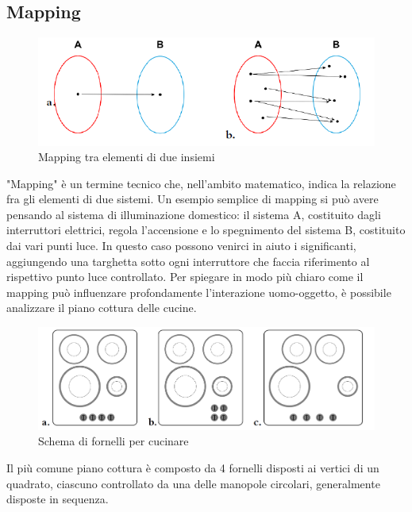 \documentclass[11pt,a4paper]{article}
\begin{document}
\subsection{Mapping}
\begin{figure}
	\begin{center}
		\includegraphics[scale=0.6]{img/001.png}
	\end{center}
	\caption{Mapping tra elementi di due insiemi}
\end{figure} 
"Mapping" è un termine tecnico che, nell’ambito matematico, indica la relazione fra gli elementi di due sistemi.
Un esempio semplice di mapping si può avere pensando al sistema di illuminazione domestico: il sistema A, costituito dagli interruttori elettrici, regola l’accensione e lo spegnimento del sistema B, costituito dai vari punti luce.
In questo caso possono venirci in aiuto i significanti, aggiungendo una targhetta sotto ogni interruttore che faccia riferimento al rispettivo punto luce controllato.
Per spiegare in modo più chiaro come il mapping può influenzare profondamente l’interazione uomo-oggetto, è possibile analizzare il piano cottura delle cucine. 
\begin{figure}
	\begin{center}
		\includegraphics[scale=0.3]{img/002.png}
	\end{center}
	\caption{Schema di fornelli per cucinare}
\end{figure}
Il più comune piano cottura è composto da 4 fornelli disposti ai vertici di un quadrato, ciascuno controllato da una delle manopole circolari, generalmente disposte in sequenza.
\pagebreak
\end{document}
